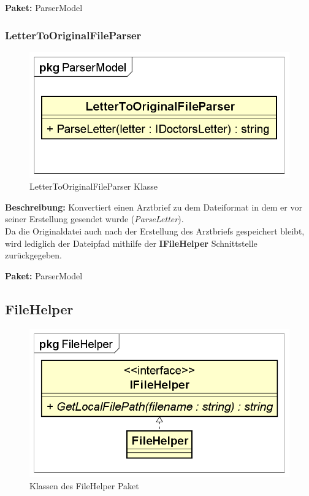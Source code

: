 \documentclass[a4paper]{scrreprt}
\begin{document}
\textbf{Paket:} ParserModel

\subsubsection{LetterToOriginalFileParser}
\begin{figure}[H]
\centering
\includegraphics[width=0.75\textheight]{graphics/Klassendiagramme/Model/LetterToOriginalFileParser.png}
\caption{LetterToOriginalFileParser Klasse}
\end{figure}
\textbf{Beschreibung:} Konvertiert einen Arztbrief zu dem Dateiformat in dem er vor seiner Erstellung gesendet wurde (\textit{ParseLetter}).\\
Da die Originaldatei auch nach der Erstellung des Arztbriefs gespeichert bleibt, wird lediglich der Dateipfad mithilfe der \textbf{IFileHelper} Schnittstelle zurückgegeben.

\textbf{Paket:} ParserModel

\subsection{FileHelper}
\begin{figure}[H]
\centering
\includegraphics[width=0.75\textheight]{graphics/Klassendiagramme/Model/FileHelperPackage.png}
\caption{Klassen des FileHelper Paket}
\end{figure}
\end{document}
